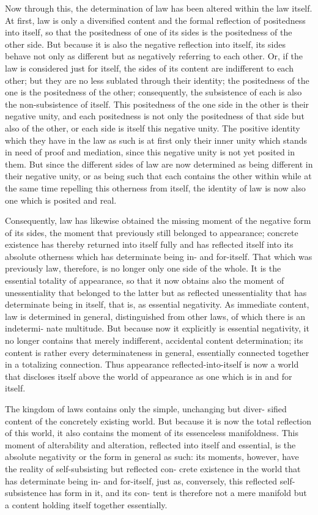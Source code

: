 Now through this, the determination of law has been altered within the
law itself. At first, law is only a diversified content and the formal reflection
of positedness into itself, so that the positedness of one of its sides is the
positedness of the other side. But because it is also the negative reflection
into itself, its sides behave not only as different but as negatively referring
to each other.
Or, if the law is considered just for itself, the sides of its
content are indifferent to each other; but they are no less sublated through
their identity; the positedness of the one is the positedness of the other;
consequently, the subsistence of each is also the non-subsistence of itself.
This positedness of the one side in the other is their negative unity, and
each positedness is not only the positedness of that side but also of the other, or
each side is itself this negative unity. The positive identity which they have
in the law as such is at first only their inner unity which stands in need of
proof and mediation, since this negative unity is not yet posited in them.
But since the different sides of law are now determined as being different
in their negative unity, or as being such that each contains the other within
while at the same time repelling this otherness from itself, the identity of
law is now also one which is posited and real.

Consequently, law has likewise obtained the missing moment of the
negative form of its sides, the moment that previously still belonged to
appearance; concrete existence has thereby returned into itself fully and
has reflected itself into its absolute otherness which has determinate being
in- and for-itself. That which was previously law, therefore, is no longer
only one side of the whole. It is the essential totality of appearance, so
that it now obtains also the moment of unessentiality that belonged to the
latter
but as reflected unessentiality that has determinate being in itself,
that is, as essential negativity.
As immediate content, law is determined
in general, distinguished from other laws, of which there is an indetermi-
nate multitude. But because now it explicitly is essential negativity, it no
longer contains that merely indifferent, accidental content determination;
its content is rather every determinateness in general, essentially connected
together in a totalizing connection. Thus appearance reflected-into-itself is
now a world that discloses itself above the world of appearance as one which
is in and for itself.

The kingdom of laws contains only the simple, unchanging but diver-
sified content of the concretely existing world. But because it is now the
total reflection of this world, it also contains the moment of its essenceless
manifoldness. This moment of alterability and alteration, reflected into
itself and essential, is the absolute negativity or the form in general as such:
its moments, however, have the reality of self-subsisting but reflected con-
crete existence in the world that has determinate being in- and for-itself,
just as, conversely, this reflected self-subsistence has form in it, and its con-
tent is therefore not a mere manifold but a content holding itself together
essentially.

